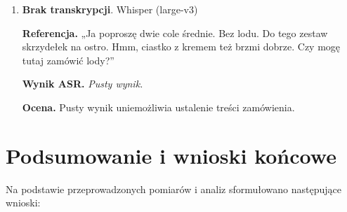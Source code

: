 \documentclass{article}
\begin{document}
\begin{enumerate}
    \item \textbf{Brak transkrypcji}. Whisper (large-v3)
    \par\textbf{Referencja.} „Ja poproszę dwie cole średnie. Bez lodu. Do tego zestaw skrzydełek na ostro. Hmm, ciastko z kremem też brzmi dobrze. Czy mogę tutaj zamówić lody?”
    \par\textbf{Wynik ASR.} \emph{Pusty wynik.}
    \par\textbf{Ocena.} Pusty wynik uniemożliwia ustalenie treści zamówienia.

\end{enumerate}


\section{Podsumowanie i wnioski końcowe}

Na podstawie przeprowadzonych pomiarów i analiz sformułowano następujące wnioski:
\end{document}
